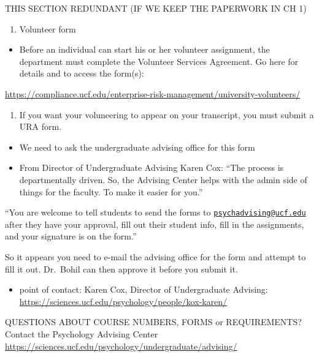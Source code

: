 \documentclass[
]{book}
\providecommand{\tightlist}{%
  \setlength{\itemsep}{0pt}\setlength{\parskip}{0pt}}
\begin{document}
THIS SECTION REDUNDANT (IF WE KEEP THE PAPERWORK IN CH 1)

\begin{enumerate}
\def\labelenumi{\arabic{enumi}.}
\tightlist
\item
  Volunteer form
\end{enumerate}

\begin{itemize}
\tightlist
\item
  Before an individual can start his or her volunteer assignment, the department must complete the Volunteer Services Agreement. Go here for details and to access the form(s):
\end{itemize}

\url{https://compliance.ucf.edu/enterprise-risk-management/university-volunteers/}

\begin{enumerate}
\def\labelenumi{\arabic{enumi}.}
\setcounter{enumi}{1}
\tightlist
\item
  If you want your voluneering to appear on your transcript, you must submit a URA form.
\end{enumerate}

\begin{itemize}
\tightlist
\item
  We need to ask the undergraduate advising office for this form
\item
  From Director of Undergraduate Advising Karen Cox: ``The process is departmentally driven. So, the Advising Center helps with the admin side of things for the faculty. To make it easier for you.''
\end{itemize}

``You are welcome to tell students to send the forms to \href{mailto:psychadvising@ucf.edu}{\nolinkurl{psychadvising@ucf.edu}} after they have your approval, fill out their student info, fill in the assignments, and your signature is on the form.''

So it appears you need to e-mail the advising office for the form and attempt to fill it out. Dr.~Bohil can then approve it before you submit it.

\begin{itemize}
\tightlist
\item
  point of contact: Karen Cox, Director of Undergraduate Advising:
  \url{https://sciences.ucf.edu/psychology/people/kox-karen/}
\end{itemize}

QUESTIONS ABOUT COURSE NUMBERS, FORMS or REQUIREMENTS?
Contact the Psychology Advising Center
\url{https://sciences.ucf.edu/psychology/undergraduate/advising/}
\end{document}
